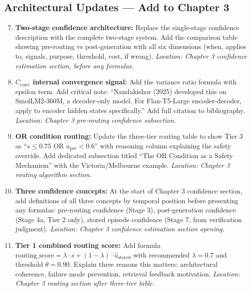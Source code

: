 \documentclass[11pt,a4paper]{article}
\newcommand{\Cconv}{C_{\text{conv}}}
\newcommand{\upre}{u_{\text{pre}}}
\newcommand{\ustored}{\hat{u}_{\text{stored}}}
\begin{document}
\subsection{Architectural Updates — Add to Chapter 3}

\begin{enumerate}
\setcounter{enumi}{6}
\item \textbf{Two-stage confidence architecture:} Replace the single-stage confidence description with the complete two-stage system. Add the comparison table showing pre-routing vs post-generation with all six dimensions (when, applies to, signals, purpose, threshold, cost, if wrong). \textit{Location: Chapter 3 confidence estimation section, before any formulas.}

\item \textbf{$\Cconv$ internal convergence signal:} Add the variance ratio formula with epsilon term. Add critical note: ``Nandakishor (2025) developed this on SmolLM2-360M, a decoder-only model. For Flan-T5-Large encoder-decoder, apply to encoder hidden states specifically.'' Add full citation to bibliography. \textit{Location: Chapter 3 pre-routing confidence subsection.}

\item \textbf{OR condition routing:} Update the three-tier routing table to show Tier 3 as ``$s \leq 0.75$ OR $\upre < 0.6$'' with reasoning column explaining the safety override. Add dedicated subsection titled ``The OR Condition as a Safety Mechanism'' with the Victoria/Melbourne example. \textit{Location: Chapter 3 routing algorithm section.}

\item \textbf{Three confidence concepts:} At the start of Chapter 3 confidence section, add definitions of all three concepts by temporal position before presenting any formulas: pre-routing confidence (Stage 3), post-generation confidence (Stage 4a, Tier 2 only), stored episode confidence (Stage 7, from verification judgment). \textit{Location: Chapter 3 confidence estimation section opening.}

\item \textbf{Tier 1 combined routing score:} Add formula $\text{routing\_score} = \lambda \cdot s + (1-\lambda) \cdot \ustored$ with recommended $\lambda = 0.7$ and threshold $\theta = 0.90$. Explain three reasons this matters: architectural coherence, failure mode prevention, retrieval feedback motivation. \textit{Location: Chapter 3 routing section after three-tier table.}


\end{enumerate}
\end{document}
